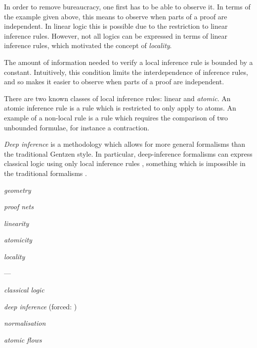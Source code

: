 In order to remove bureaucracy, one first has to be able to observe it. In terms of the example given above, this means to observe when parts of a proof are independent. In linear logic this is possible due to the restriction to linear inference rules. However, not all logics can be expressed in terms of linear inference rules, which motivated the concept of \emph{locality}.

The amount of information needed to verify a local inference rule is bounded by a constant. Intuitively, this condition limits the interdependence of inference rules, and so makes it easier to observe when parts of a proof are independent.

There are two known classes of local inference rules: linear and \emph{atomic}. An atomic inference rule is a rule which is restricted to only apply to atoms.  An example of a non-local rule is a rule which requires the comparison of two unbounded formulae, for instance a contraction.

\emph{Deep inference} \cite{Gugl:06:A-System:kl} is a methodology which allows for more general formalisms than the traditional Gentzen style. In particular, deep-inference formalisms can express classical logic using only local inference rules \cite{BrunTiu:01:A-Local-:mz}, something which is impossible in the traditional formalisms \cite{Brun:03:Two-Rest:mn}.




\emph{geometry}

\emph{proof nets} 

\emph{linearity}

\emph{atomicity}

\emph{locality}

---

\emph{classical logic}

\emph{deep inference}  (forced: )

\emph{normalisation}

\emph{atomic flows} \cite{GuglGund:07:Normalis:lr}


